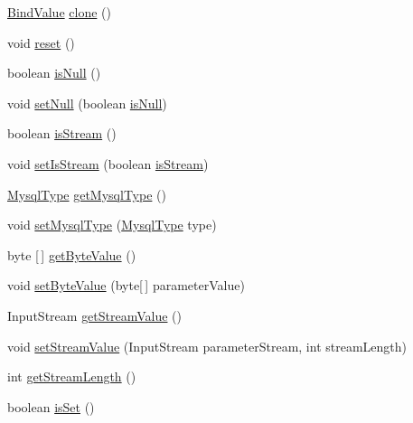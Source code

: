 \begin{DoxyCompactItemize}
\item 
\mbox{\hyperlink{interfacecom_1_1mysql_1_1cj_1_1_bind_value}{Bind\+Value}} \mbox{\hyperlink{interfacecom_1_1mysql_1_1cj_1_1_bind_value_a89f1df9d90be93c8b8e446c264481303}{clone}} ()
\item 
void \mbox{\hyperlink{interfacecom_1_1mysql_1_1cj_1_1_bind_value_aeff59ff50904893a11b96f2ff560f974}{reset}} ()
\item 
boolean \mbox{\hyperlink{interfacecom_1_1mysql_1_1cj_1_1_bind_value_af0ec3dd14fdf2d01af7e7195ef43369a}{is\+Null}} ()
\item 
void \mbox{\hyperlink{interfacecom_1_1mysql_1_1cj_1_1_bind_value_a0f9adcc47481b3e041fe5cfb8f18818c}{set\+Null}} (boolean \mbox{\hyperlink{interfacecom_1_1mysql_1_1cj_1_1_bind_value_af0ec3dd14fdf2d01af7e7195ef43369a}{is\+Null}})
\item 
boolean \mbox{\hyperlink{interfacecom_1_1mysql_1_1cj_1_1_bind_value_ab00e3f54fd1417769cb9ae5ea54c0983}{is\+Stream}} ()
\item 
void \mbox{\hyperlink{interfacecom_1_1mysql_1_1cj_1_1_bind_value_a9ceb17c282abbc10981b7cbba6ca3086}{set\+Is\+Stream}} (boolean \mbox{\hyperlink{interfacecom_1_1mysql_1_1cj_1_1_bind_value_ab00e3f54fd1417769cb9ae5ea54c0983}{is\+Stream}})
\item 
\mbox{\hyperlink{enumcom_1_1mysql_1_1cj_1_1_mysql_type}{Mysql\+Type}} \mbox{\hyperlink{interfacecom_1_1mysql_1_1cj_1_1_bind_value_a265b324d28aac43fe658894df12db699}{get\+Mysql\+Type}} ()
\item 
void \mbox{\hyperlink{interfacecom_1_1mysql_1_1cj_1_1_bind_value_abb32f012246317a42d4c65ac7b6916a8}{set\+Mysql\+Type}} (\mbox{\hyperlink{enumcom_1_1mysql_1_1cj_1_1_mysql_type}{Mysql\+Type}} type)
\item 
byte \mbox{[}$\,$\mbox{]} \mbox{\hyperlink{interfacecom_1_1mysql_1_1cj_1_1_bind_value_a10d85fd3edb20a2c63250127d08cdcd3}{get\+Byte\+Value}} ()
\item 
void \mbox{\hyperlink{interfacecom_1_1mysql_1_1cj_1_1_bind_value_ab8c1dc59e4f139d0004481cb608a41aa}{set\+Byte\+Value}} (byte\mbox{[}$\,$\mbox{]} parameter\+Value)
\item 
Input\+Stream \mbox{\hyperlink{interfacecom_1_1mysql_1_1cj_1_1_bind_value_aee74c54d4ba871b7e63cf8a76d3f04fd}{get\+Stream\+Value}} ()
\item 
void \mbox{\hyperlink{interfacecom_1_1mysql_1_1cj_1_1_bind_value_aae317c620c8bbcaca76be87eacaa5533}{set\+Stream\+Value}} (Input\+Stream parameter\+Stream, int stream\+Length)
\item 
int \mbox{\hyperlink{interfacecom_1_1mysql_1_1cj_1_1_bind_value_a4388253fc77d9f51682b5c67a6869d8e}{get\+Stream\+Length}} ()
\item 
boolean \mbox{\hyperlink{interfacecom_1_1mysql_1_1cj_1_1_bind_value_a559abc1794dd2783db255ab3b341fa70}{is\+Set}} ()
\end{DoxyCompactItemize}


